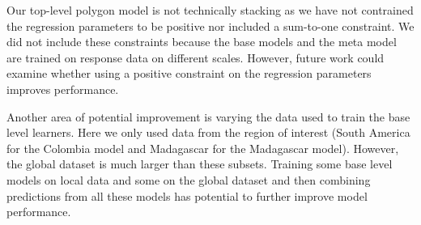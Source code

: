 \documentclass[11pt]{article}
\begin{document}



Our top-level polygon model is not technically stacking as we have not contrained the regression parameters to be positive nor included a sum-to-one constraint.
We did not include these constraints because the base models and the meta model are trained on response data on different scales.
However, future work could examine whether using a positive constraint on the regression parameters improves performance.

Another area of potential improvement is varying the data used to train the base level learners.
Here we only used data from the region of interest (South America for the Colombia model and Madagascar for the Madagascar model).
However, the global dataset is much larger than these subsets.
Training some base level models on local data and some on the global dataset and then combining predictions from all these models has potential to further improve model performance.


 

\end{document}
